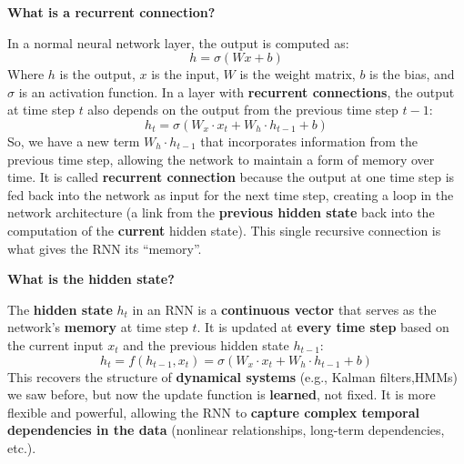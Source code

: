 \newpage
\begin{flushleft}
    \textcolor{Green3}{ \textbf{What is a recurrent connection?}}
\end{flushleft}
In a normal neural network layer, the output is computed as:
\begin{equation*}
    h = \sigma\left(Wx + b\right)
\end{equation*}
Where $h$ is the output, $x$ is the input, $W$ is the weight matrix, $b$ is the bias, and $\sigma$ is an activation function. In a layer with \textbf{recurrent connections}, the output at time step $t$ also depends on the output from the previous time step $t-1$:
\begin{equation*}
    h_t = \sigma\left(W_x \cdot x_t + W_h \cdot h_{t-1} + b\right)
\end{equation*}
So, we have a new term $W_h \cdot h_{t-1}$ that incorporates information from the previous time step, allowing the network to maintain a form of memory over time. It is called \textbf{recurrent connection} because the output at one time step is fed back into the network as input for the next time step, creating a loop in the network architecture (a link from the \textbf{previous hidden state} back into the computation of the \textbf{current} hidden state). This single recursive connection is what gives the RNN its ``memory''.

\highspace
\begin{flushleft}
    \textcolor{Green3}{ \textbf{What is the hidden state?}}
\end{flushleft}
The \textbf{hidden state} $h_t$ in an RNN is a \textbf{continuous vector} that serves as the network's \textbf{memory} at time step $t$. It is updated at \textbf{every time step} based on the current input $x_t$ and the previous hidden state $h_{t-1}$:
\begin{equation*}
    h_t = f\left(h_{t-1}, x_t\right) = \sigma\left(W_x \cdot x_t + W_h \cdot h_{t-1} + b\right)
\end{equation*}
This recovers the structure of \textbf{dynamical systems} (e.g., Kalman filters,\break HMMs) we saw before, but now the update function is \textbf{learned}, not fixed. It is more flexible and powerful, allowing the RNN to \textbf{capture complex temporal dependencies in the data} (nonlinear relationships, long-term dependencies, etc.).

